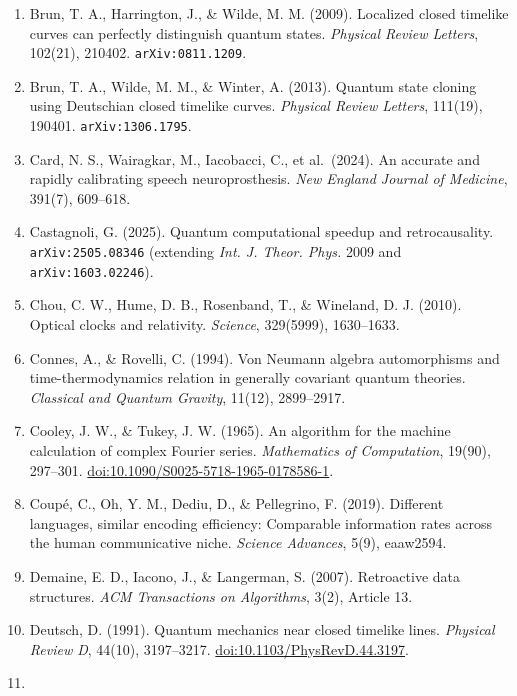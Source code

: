 \documentclass[10pt,letterpaper]{article}
\begin{document}
\begin{enumerate}
  hard problems. \emph{Foundations of Physics Letters}, 16(3), 245--253.
  \texttt{arXiv:gr-\allowbreak{}qc/\allowbreak{}0209061}.
\item
  Brun, T. A., Harrington, J., \& Wilde, M. M. (2009). Localized closed
  timelike curves can perfectly distinguish quantum states.
  \emph{Physical Review Letters}, 102(21), 210402.
  \texttt{arXiv:0811.\allowbreak{}1209}.
\item
  Brun, T. A., Wilde, M. M., \& Winter, A. (2013). Quantum state cloning
  using Deutschian closed timelike curves. \emph{Physical Review
  Letters}, 111(19), 190401. \texttt{arXiv:1306.\allowbreak{}1795}.
\item
  Card, N. S., Wairagkar, M., Iacobacci, C., et al.~(2024). An accurate
  and rapidly calibrating speech neuroprosthesis. \emph{New England
  Journal of Medicine}, 391(7), 609--618.
\item
  Castagnoli, G. (2025). Quantum computational speedup and
  retrocausality. \texttt{arXiv:2505.\allowbreak{}08346} (extending \emph{Int. J.
  Theor. Phys.} 2009 and \texttt{arXiv:1603.\allowbreak{}02246}).
\item
  Chou, C. W., Hume, D. B., Rosenband, T., \& Wineland, D. J. (2010).
  Optical clocks and relativity. \emph{Science}, 329(5999), 1630--1633.
\item
  Connes, A., \& Rovelli, C. (1994). Von Neumann algebra automorphisms
  and time-thermodynamics relation in generally covariant quantum
  theories. \emph{Classical and Quantum Gravity}, 11(12), 2899--2917.
\item
  Cooley, J. W., \& Tukey, J. W. (1965). An algorithm for the machine
  calculation of complex Fourier series. \emph{Mathematics of
  Computation}, 19(90), 297--301.
  \href{https://doi.org/10.1090/S0025-5718-1965-0178586-1}{doi:10.1090/S0025-5718-1965-0178586-1}.
\item
  Coupé, C., Oh, Y. M., Dediu, D., \& Pellegrino, F. (2019). Different
  languages, similar encoding efficiency: Comparable information rates
  across the human communicative niche. \emph{Science Advances}, 5(9),
  eaaw2594.
\item
  Demaine, E. D., Iacono, J., \& Langerman, S. (2007). Retroactive data
  structures. \emph{ACM Transactions on Algorithms}, 3(2), Article 13.
\item
  Deutsch, D. (1991). Quantum mechanics near closed timelike lines.
  \emph{Physical Review D}, 44(10), 3197--3217.
  \href{https://doi.org/10.1103/PhysRevD.44.3197}{doi:10.1103/PhysRevD.44.3197}.
\item

\end{enumerate}
\end{document}
